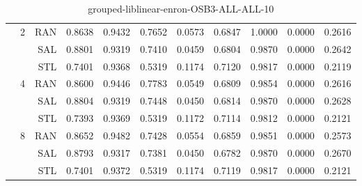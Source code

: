 \begin{center}
\begin{table}[htbp]
\begin{center}
\begin{tabular}{ | r | r | r | r | r | r | r | r | r | r | r |}
 & \multirow{3}{*}{2} & RAN & 0.8638 & 0.9432 & 0.7652 & 0.0573 & 0.6847 & 1.0000 & 0.0000 & 0.2616\\ \cline{3-11}
 &   & SAL & 0.8801 & 0.9319 & 0.7410 & 0.0459 & 0.6804 & 0.9870 & 0.0000 & 0.2642\\ \cline{3-11}
 &   & STL & 0.7401 & 0.9368 & 0.5319 & 0.1174 & 0.7120 & 0.9817 & 0.0000 & 0.2119\\ \cline{2-11}
 & \multirow{3}{*}{4} & RAN & 0.8600 & 0.9446 & 0.7783 & 0.0549 & 0.6809 & 0.9854 & 0.0000 & 0.2616\\ \cline{3-11}
 &   & SAL & 0.8804 & 0.9319 & 0.7448 & 0.0450 & 0.6814 & 0.9870 & 0.0000 & 0.2628\\ \cline{3-11}
 &   & STL & 0.7393 & 0.9369 & 0.5319 & 0.1172 & 0.7114 & 0.9812 & 0.0000 & 0.2121\\ \cline{2-11}
 & \multirow{3}{*}{8} & RAN & 0.8652 & 0.9482 & 0.7428 & 0.0554 & 0.6859 & 0.9851 & 0.0000 & 0.2573\\ \cline{3-11}
 &   & SAL & 0.8793 & 0.9317 & 0.7381 & 0.0450 & 0.6782 & 0.9870 & 0.0000 & 0.2670\\ \cline{3-11}
 &   & STL & 0.7401 & 0.9372 & 0.5319 & 0.1174 & 0.7119 & 0.9817 & 0.0000 & 0.2121\\ \cline{2-11}
\hline
\end{tabular}
\caption{grouped-liblinear-enron-OSB3-ALL-ALL-10}
\end{center}
 \end{table}
\end{center}

